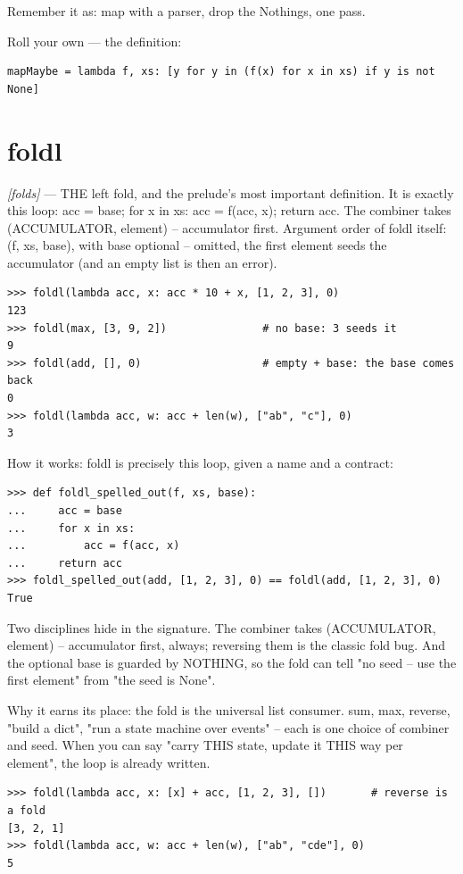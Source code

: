 \documentclass[11pt,letterpaper]{book}
\begin{document}
Remember it as: map with a parser, drop the Nothings, one pass.


Roll your own --- the definition:

\begin{lstlisting}[style=code]
mapMaybe = lambda f, xs: [y for y in (f(x) for x in xs) if y is not None]
\end{lstlisting}

\section{foldl}
\noindent\textit{[folds]} --- THE left fold, and the prelude's most important definition. It is exactly this loop: acc = base; for x in xs: acc = f(acc, x); return acc. The combiner takes (ACCUMULATOR, element) -- accumulator first. Argument order of foldl itself: (f, xs, base), with base optional -- omitted, the first element seeds the accumulator (and an empty list is then an error).
\begin{lstlisting}[style=spec]
>>> foldl(lambda acc, x: acc * 10 + x, [1, 2, 3], 0)
123
>>> foldl(max, [3, 9, 2])               # no base: 3 seeds it
9
>>> foldl(add, [], 0)                   # empty + base: the base comes back
0
>>> foldl(lambda acc, w: acc + len(w), ["ab", "c"], 0)
3
\end{lstlisting}

How it works: foldl is precisely this loop, given a name and a contract:

\begin{lstlisting}[style=spec]
>>> def foldl_spelled_out(f, xs, base):
...     acc = base
...     for x in xs:
...         acc = f(acc, x)
...     return acc
>>> foldl_spelled_out(add, [1, 2, 3], 0) == foldl(add, [1, 2, 3], 0)
True
\end{lstlisting}

Two disciplines hide in the signature. The combiner takes (ACCUMULATOR, element) -- accumulator first, always; reversing them is the classic fold bug. And the optional base is guarded by NOTHING, so the fold can tell "no seed -- use the first element" from "the seed is None".


Why it earns its place: the fold is the universal list consumer. sum, max, reverse, "build a dict", "run a state machine over events" -- each is one choice of combiner and seed. When you can say "carry THIS state, update it THIS way per element", the loop is already written.

\begin{lstlisting}[style=spec]
>>> foldl(lambda acc, x: [x] + acc, [1, 2, 3], [])       # reverse is a fold
[3, 2, 1]
>>> foldl(lambda acc, w: acc + len(w), ["ab", "cde"], 0)
5
\end{lstlisting}
\end{document}
